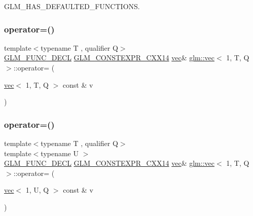 G\+L\+M\+\_\+\+H\+A\+S\+\_\+\+D\+E\+F\+A\+U\+L\+T\+E\+D\+\_\+\+F\+U\+N\+C\+T\+I\+O\+NS. 

\mbox{\label{structglm_1_1vec_3_011_00_01_t_00_01_q_01_4_ac0ab0e9e96caa507674d12526367ea11}} 
\subsubsection{\texorpdfstring{operator=()}{operator=()}\hspace{0.1cm}{\footnotesize\ttfamily [2/3]}}
{\footnotesize\ttfamily template$<$typename T , qualifier Q$>$ \\
\hyperlink{setup_8hpp_ab2d052de21a70539923e9bcbf6e83a51}{G\+L\+M\+\_\+\+F\+U\+N\+C\+\_\+\+D\+E\+CL} \hyperlink{setup_8hpp_a4dd12abf5e1164bc57f3a34671d03844}{G\+L\+M\+\_\+\+C\+O\+N\+S\+T\+E\+X\+P\+R\+\_\+\+C\+X\+X14} \hyperlink{structglm_1_1vec}{vec}\& \hyperlink{structglm_1_1vec}{glm\+::vec}$<$ 1, T, Q $>$\+::operator= (\begin{DoxyParamCaption}\item[{\hyperlink{structglm_1_1vec}{vec}$<$ 1, T, Q $>$ const \&}]{v }\end{DoxyParamCaption})}

\mbox{\label{structglm_1_1vec_3_011_00_01_t_00_01_q_01_4_a2ebfdb3250071dc75ee92e29fbbf0062}} 
\subsubsection{\texorpdfstring{operator=()}{operator=()}\hspace{0.1cm}{\footnotesize\ttfamily [3/3]}}
{\footnotesize\ttfamily template$<$typename T , qualifier Q$>$ \\
template$<$typename U $>$ \\
\hyperlink{setup_8hpp_ab2d052de21a70539923e9bcbf6e83a51}{G\+L\+M\+\_\+\+F\+U\+N\+C\+\_\+\+D\+E\+CL} \hyperlink{setup_8hpp_a4dd12abf5e1164bc57f3a34671d03844}{G\+L\+M\+\_\+\+C\+O\+N\+S\+T\+E\+X\+P\+R\+\_\+\+C\+X\+X14} \hyperlink{structglm_1_1vec}{vec}\& \hyperlink{structglm_1_1vec}{glm\+::vec}$<$ 1, T, Q $>$\+::operator= (\begin{DoxyParamCaption}\item[{\hyperlink{structglm_1_1vec}{vec}$<$ 1, U, Q $>$ const \&}]{v }\end{DoxyParamCaption})}

